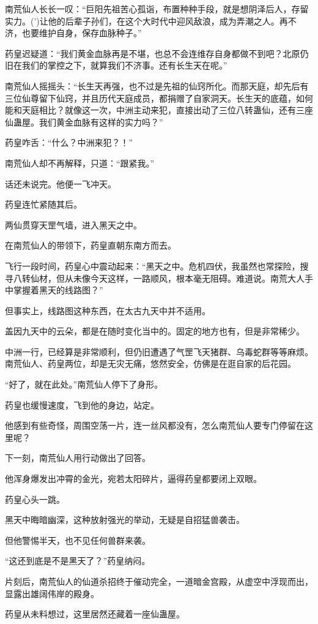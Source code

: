 \begin{this_body}
南荒仙人长长一叹：“巨阳先祖苦心孤诣，布置种种手段，就是想阴泽后人，存留实力。(’)让他的后辈子孙们，在这个大时代中迎风敌浪，成为弄潮之人。再不济，也要维护自身，保存血脉种子。”

药皇迟疑道：“我们黄金血脉再是不堪，也总不会连维存自身都做不到吧？北原仍旧在我们的掌控之下，就算我们不济事。还有长生天在呢。”

南荒仙人摇摇头：“长生天再强，也不过是先祖的仙窍所化。而那天庭，却先后有三位仙尊留下仙窍，并且历代天庭成员，都捐赠了自家洞天。长生天的底蕴，如何能和天庭相比？就像这一次，中洲主动来犯，直接出动了三位八转蛊仙，还有三座仙蛊屋。我们黄金血脉有这样的实力吗？”

药皇咋舌：“什么？中洲来犯？！”

南荒仙人却不再解释，只道：“跟紧我。”

话还未说完。他便一飞冲天。

药皇连忙紧随其后。

两仙贯穿天罡气墙，进入黑天之中。

在南荒仙人的带领下，药皇直朝东南方而去。

飞行一段时间，药皇心中震动起来：“黑天之中。危机四伏，我虽然也常探险，搜寻八转仙材，但从未像今天这样，一路顺风，根本毫无阻碍。难道说。南荒大人手中掌握着黑天的线路图？”

但事实上，线路图这种东西，在太古九天中并不适用。

盖因九天中的云朵，都是在随时变化当中的。固定的地方也有，但是非常稀少。

中洲一行，已经算是非常顺利，但仍旧遭遇了气罡飞天猪群、乌毒蛇群等等麻烦。南荒仙人、药皇两位，却是无灾无痛，悠然安全，仿佛是在逛自家的后花园。

“好了，就在此处。”南荒仙人停下了身形。

药皇也缓慢速度，飞到他的身边，站定。

他感到有些奇怪，周围空荡一片，连一丝风都没有，怎么南荒仙人要专门停留在这里呢？

下一刻，南荒仙人用行动做出了回答。

他浑身爆发出冲霄的金光，宛若太阳碎片，逼得药皇都要闭上双眼。

药皇心头一跳。

黑天中晦暗幽深，这种放射强光的举动，无疑是自招猛兽袭击。

但他警惕半天，也不见任何兽群来袭。

“这还到底是不是黑天了？”药皇纳闷。

片刻后，南荒仙人的仙道杀招终于催动完全，一道暗金宫殿，从虚空中浮现而出，显露出雄阔伟岸的殿身。

药皇从未料想过，这里居然还藏着一座仙蛊屋。


\end{this_body}
